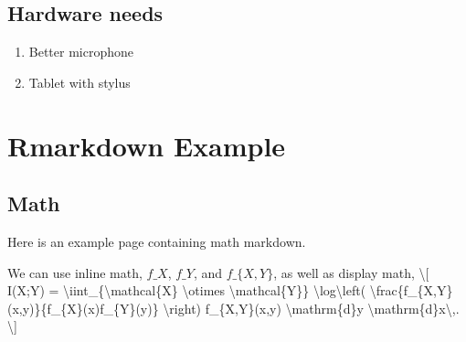 \documentclass[
]{article}
\newenvironment{Shaded}{\begin{snugshade}}{\end{snugshade}}
\newcommand{\NormalTok}[1]{#1}
\newcommand{\SpecialCharTok}[1]{\textcolor[rgb]{0.00,0.00,0.00}{#1}}
\newcommand{\SpecialStringTok}[1]{\textcolor[rgb]{0.31,0.60,0.02}{#1}}
\providecommand{\tightlist}{%
  \setlength{\itemsep}{0pt}\setlength{\parskip}{0pt}}
\begin{document}
\hypertarget{hardware-needs}{%
\subsection*{Hardware needs}\label{hardware-needs}}

\begin{enumerate}
\def\labelenumi{\arabic{enumi}.}
\tightlist
\item
  Better microphone
\item
  Tablet with stylus
\end{enumerate}

\hypertarget{rmarkdown-example}{%
\section*{Rmarkdown Example}\label{rmarkdown-example}}

\hypertarget{math}{%
\subsection*{Math}\label{math}}

Here is an example page containing math markdown.

\begin{Shaded}
\begin{Highlighting}[]
\NormalTok{We can use inline math, }\SpecialStringTok{$f\_X$}\NormalTok{, }\SpecialStringTok{$f\_Y$}\NormalTok{, and }\SpecialStringTok{$f\_\{X,Y\}$}\NormalTok{, as well as display math, }
\SpecialStringTok{\textbackslash{}[}
\SpecialStringTok{  I(X;Y)}
\SpecialStringTok{  = }\SpecialCharTok{\textbackslash{}iint}\SpecialStringTok{\_\{}\SpecialCharTok{\textbackslash{}mathcal}\SpecialStringTok{\{X\} }\SpecialCharTok{\textbackslash{}otimes}\SpecialStringTok{ }\SpecialCharTok{\textbackslash{}mathcal}\SpecialStringTok{\{Y\}\}}
\SpecialStringTok{  }\SpecialCharTok{\textbackslash{}log\textbackslash{}left}\SpecialStringTok{( }\SpecialCharTok{\textbackslash{}frac}\SpecialStringTok{\{f\_\{X,Y\}(x,y)\}\{f\_\{X\}(x)f\_\{Y\}(y)\} }\SpecialCharTok{\textbackslash{}right}\SpecialStringTok{)}
\SpecialStringTok{  f\_\{X,Y\}(x,y) }\SpecialCharTok{\textbackslash{}mathrm}\SpecialStringTok{\{d\}y }\SpecialCharTok{\textbackslash{}mathrm}\SpecialStringTok{\{d\}x}\SpecialCharTok{\textbackslash{},}\SpecialStringTok{.}
\SpecialStringTok{\textbackslash{}]}
\end{Highlighting}
\end{Shaded}
\end{document}
